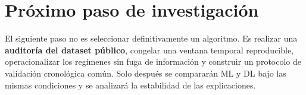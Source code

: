\documentclass[11pt,letterpaper]{article}
\begin{document}
\section{Próximo paso de investigación}

El siguiente paso no es seleccionar definitivamente un algoritmo. Es realizar una \textbf{auditoría del dataset público}, congelar una ventana temporal reproducible, operacionalizar los regímenes sin fuga de información y construir un protocolo de validación cronológica común. Solo después se compararán ML y DL bajo las mismas condiciones y se analizará la estabilidad de las explicaciones.

\printbibliography[title={Referencias}]
\end{document}
